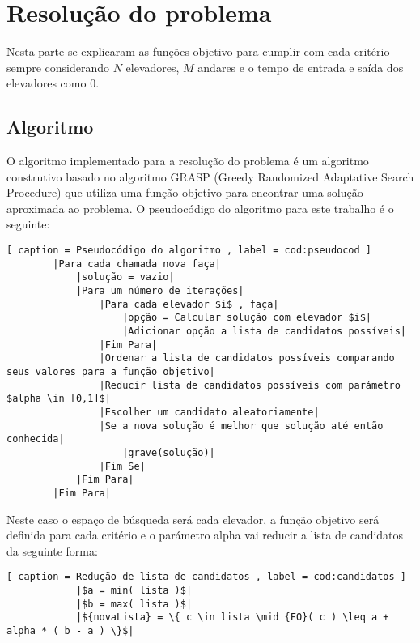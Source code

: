\section{Resolução do problema}
\label{sec:criterios}

Nesta parte se explicaram as funções objetivo para cumplir com cada critério sempre considerando $N$ elevadores, $M$ andares e o tempo de entrada e saída dos elevadores como 0.
\subsection{Algoritmo}
	O algoritmo implementado para a resolução do problema é um algoritmo construtivo basado no algoritmo GRASP (Greedy Randomized Adaptative Search Procedure) que utiliza uma função objetivo para encontrar uma solução aproximada ao problema. O pseudocódigo do algoritmo para este trabalho é o seguinte:
	\begin{lstlisting}[ caption = Pseudocódigo do algoritmo , label = cod:pseudocod ]
		|Para cada chamada nova faça|
			|solução = vazio|
			|Para um número de iterações|
				|Para cada elevador $i$ , faça|
					|opção = Calcular solução com elevador $i$|
					|Adicionar opção a lista de candidatos possíveis|
				|Fim Para|
				|Ordenar a lista de candidatos possíveis comparando seus valores para a função objetivo|
				|Reducir lista de candidatos possíveis com parámetro $alpha \in [0,1]$|
				|Escolher um candidato aleatoriamente|
				|Se a nova solução é melhor que solução até então conhecida|
					|grave(solução)|
				|Fim Se|
			|Fim Para|
		|Fim Para|
	\end{lstlisting}
	Neste caso o espaço de búsqueda será cada elevador, a função objetivo será definida para cada critério e o parámetro alpha vai reducir a lista de candidatos da seguinte forma:
		\begin{lstlisting}[ caption = Redução de lista de candidatos , label = cod:candidatos ]
			|$a = min( lista )$|
			|$b = max( lista )$|
			|${novaLista} = \{ c \in lista \mid {FO}( c ) \leq a + alpha * ( b - a ) \}$|
		\end{lstlisting}
	
